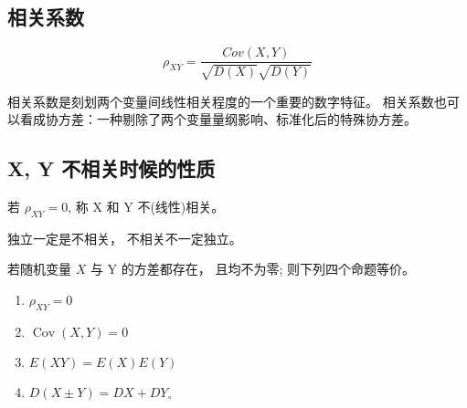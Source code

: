 \subsection{相关系数}

\begin{equation}
 \rho_{XY} =   \frac{Cov(X,Y) }{\sqrt{D(X)} \sqrt{D(Y)}}
\end{equation}

相关系数是刻划两个变量间线性相关程度的一个重要的数字特征。 相关系数也可以看成协方差：一种剔除了两个变量量纲影响、标准化后的特殊协方差。 

\subsection{X, Y 不相关时候的性质}

若 $\rho_{X Y}=0$, 称 X 和 Y 不(线性)相关。 

\begin{corollary}
    独立一定是不相关， 不相关不一定独立。 
\end{corollary}

\begin{theorem}
    若随机变量 $X$ 与 Y 的方差都存在， 且均不为零; 则下列四个命题等价。 
    \begin{enumerate}
        \item $\rho_{X Y}=0$
        \item $\operatorname{Cov}(X, Y)=0$
        \item $E(X Y)=E (X) E (Y)$
        \item $D(X \pm Y)=D X+D Y_{\circ}$
    \end{enumerate}
\end{theorem}